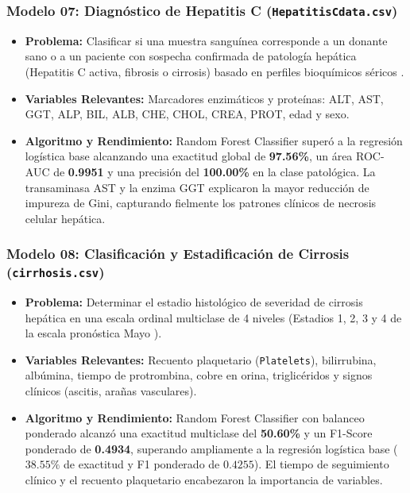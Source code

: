 \documentclass[12pt,letterpaper]{article}
\begin{document}
\subsubsection{Modelo 07: Diagnóstico de Hepatitis C (\texttt{HepatitisCdata.csv})}
\begin{itemize}[leftmargin=*]
    \item \textbf{Problema:} Clasificar si una muestra sanguínea corresponde a un donante sano o a un paciente con sospecha confirmada de patología hepática (Hepatitis C activa, fibrosis o cirrosis) basado en perfiles bioquímicos séricos \cite{lichtinghagen2013hepatitis}.
    \item \textbf{Variables Relevantes:} Marcadores enzimáticos y proteínas: ALT, AST, GGT, ALP, BIL, ALB, CHE, CHOL, CREA, PROT, edad y sexo.
    \item \textbf{Algoritmo y Rendimiento:} Random Forest Classifier superó a la regresión logística base alcanzando una exactitud global de \textbf{97.56\%}, un área ROC-AUC de \textbf{0.9951} y una precisión del \textbf{100.00\%} en la clase patológica. La transaminasa AST y la enzima GGT explicaron la mayor reducción de impureza de Gini, capturando fielmente los patrones clínicos de necrosis celular hepática.
\end{itemize}

\subsubsection{Modelo 08: Clasificación y Estadificación de Cirrosis (\texttt{cirrhosis.csv})}
\begin{itemize}[leftmargin=*]
    \item \textbf{Problema:} Determinar el estadio histológico de severidad de cirrosis hepática en una escala ordinal multiclase de 4 niveles (Estadios 1, 2, 3 y 4 de la escala pronóstica Mayo \cite{dickson1989prognosis}).
    \item \textbf{Variables Relevantes:} Recuento plaquetario (\texttt{Platelets}), bilirrubina, albúmina, tiempo de protrombina, cobre en orina, triglicéridos y signos clínicos (ascitis, arañas vasculares).
    \item \textbf{Algoritmo y Rendimiento:} Random Forest Classifier con balanceo ponderado alcanzó una exactitud multiclase del \textbf{50.60\%} y un F1-Score ponderado de \textbf{0.4934}, superando ampliamente a la regresión logística base ($38.55\%$ de exactitud y F1 ponderado de $0.4255$). El tiempo de seguimiento clínico y el recuento plaquetario encabezaron la importancia de variables.
\end{itemize}
\end{document}
